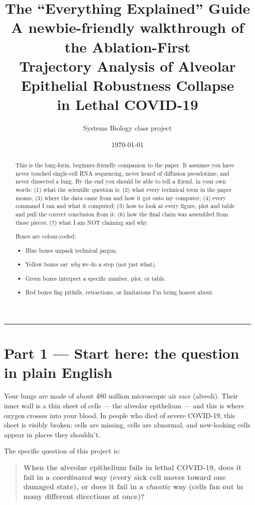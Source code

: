 \documentclass[11pt]{article}
\title{The ``Everything Explained'' Guide\\
\large{A newbie-friendly walkthrough of the Ablation-First\\
Trajectory Analysis of Alveolar Epithelial Robustness Collapse\\
in Lethal COVID-19}}
\author{Systems Biology class project}
\date{\today}
\begin{document}
\maketitle

\begin{abstract}
\noindent This is the long-form, beginner-friendly companion to the paper. It assumes
you have never touched single-cell RNA sequencing, never heard of diffusion
pseudotime, and never dissected a lung. By the end you should be able to tell a
friend, in your own words: (1) what the scientific question is; (2) what every
technical term in the paper means; (3) where the data came from and how it got
onto my computer; (4) every command I ran and what it computed; (5) how to look
at every figure, plot and table and pull the correct conclusion from it;
(6) how the final claim was assembled from those pieces; (7) what I am NOT
claiming and why.

Boxes are colour-coded:
\begin{itemize}
\item Blue boxes unpack technical jargon.
\item Yellow boxes say \emph{why} we do a step (not just what).
\item Green boxes interpret a specific number, plot, or table.
\item Red boxes flag pitfalls, retractions, or limitations I'm being honest about.
\end{itemize}
\end{abstract}

\tableofcontents
\bigskip
\hrule
\bigskip

\section{Part 1 --- Start here: the question in plain English}

Your lungs are made of about 480 million microscopic air sacs (alveoli).
Their inner wall is a thin sheet of cells --- the alveolar epithelium ---
and this is where oxygen crosses into your blood. In people who died of
severe COVID-19, this sheet is visibly broken: cells are missing, cells are
abnormal, and new-looking cells appear in places they shouldn't.

The specific question of this project is:
\begin{quote}
\textbf{When the alveolar epithelium fails in lethal COVID-19, does it fail in a
\emph{coordinated} way (every sick cell moves toward one damaged state), or does
it fail in a \emph{chaotic} way (cells fan out in many different directions at
once)?}
\end{quote}
\end{document}
